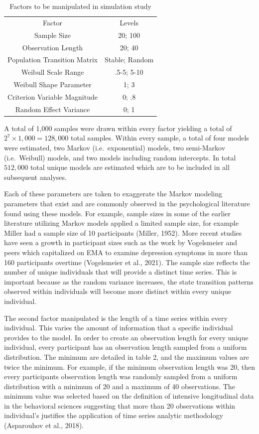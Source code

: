 \documentclass[12pt]{./styles/outhesis}
\begin{document}
\begin{table}
    \centering
    \begin{tabular}{cc}
         Factor & Levels\\
         Sample Size & 20; 100\\
         Observation Length & 20; 40\\
         Population Transition Matrix & Stable; Random\\
         Weibull Scale Range & .5-5; 5-10\\
         Weibull Shape Parameter & 1; 3\\
         Criterion Variable Magnitude & 0; .8\\
         Random Effect Variance & 0; 1\\
    \end{tabular}
    \caption{Factors to be manipulated in simulation study}
    \label{tab:my_label}
\end{table}

A total of 1,000 samples were drawn within every factor yielding a total
of \(2^7 \times 1,000 = 128,000\) total samples. Within every sample, a
total of four models were estimated, two Markov (i.e.~exponential)
models, two semi-Markov (i.e.~Weibull) models, and two models including
random intercepts. In total \(512,000\) total unique models are
estimated which are to be included in all subsequent analyses.

Each of these parameters are taken to exaggerate the Markov modeling
parameters that exist and are commonly observed in the psychological
literature found using these models. For example, sample sizes in some
of the earlier literature utilizing Markov models applied a limited
sample size, for example Miller had a sample size of 10 participants
(Miller, 1952). More recent studies have seen a growth in participant
sizes such as the work by Vogelsmeier and peers which capitalized on EMA
to examine depression symptoms in more than 160 participants overtime
(Vogelsmeier et al., 2021). The sample size reflects the number of
unique individuals that will provide a distinct time series. This is
important because as the random variance increases, the state transition
patterns observed within individuals will become more distinct within
every unique individual.

The second factor manipulated is the length of a time series within
every individual. This varies the amount of information that a specific
individual provides to the model. In order to create an observation
length for every unique individual, every participant has an observation
length sampled from a uniform distribution. The minimum are detailed in
table 2, and the maximum values are twice the minimum. For example, if
the minimum observation length was 20, then every participants
observation length was randomly sampled from a uniform distribution with
a minimum of 20 and a maximum of 40 observations. The minimum value was
selected based on the definition of intensive longitudinal data in the
behavioral sciences suggesting that more than 20 observations within
individual's justifies the application of time series analytic
methodology (Asparouhov et al., 2018).
\end{document}
